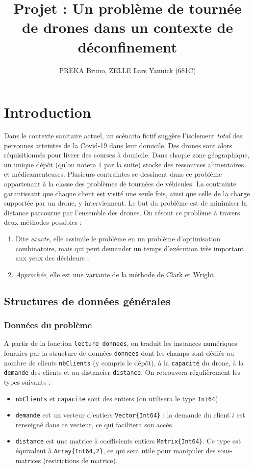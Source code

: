 \documentclass[french, 11pt, a4paper]{article} %
\title{Projet : Un problème de tournée de drones dans un contexte de déconfinement}
\author{PREKA Bruno, ZELLE Lars Yannick (681C)}
\newcommand{\smb}{\smallbreak}
\begin{document}
\maketitle



\section{Introduction}

Dans le contexte sanitaire actuel, un scénario fictif suggère l'isolement \emph{total} des personnes
atteintes de la Covid-19 dans leur domicile. Des drones sont alors réquisitionnés pour livrer des courses
à domicile.
\smb Dans chaque zone géographique, un unique dépôt (qu'on notera $1$ par la suite) stocke des ressources alimentaires et médicamenteuses.
Plusieurs contraintes se dessinent dans ce problème appartenant à la classe des problèmes de tournées de véhicules.
La contrainte garantissant que chaque client est visité une seule fois, ainsi que celle de la charge supportée par un drone,
y interviennent.
Le but du problème est de minimiser la distance parcourue par l'ensemble des drones.
\smb On résout ce problème à travers deux méthodes possibles :
\vspace{-0.2cm}
\begin{enumerate}
    \item Dite \emph{exacte}, elle assimile le problème en un problème d'optimisation
combinatoire, mais qui peut demander un temps d'exécution très important aux yeux des décideurs ;
    \item \emph{Approchée}, elle est une variante de la méthode de Clark et Wright.
\end{enumerate}

\subsection{Structures de données générales}

\subsubsection{Données du problème}
A partir de la fonction \verb+lecture_donnees+, on traduit les instances numériques fournies
par la structure de données 
\verb+donnees+ dont les champs sont dédiés au nombre de clients \verb+nbClients+ (y compris le dépôt), à
la \verb+capacité+ du drone, à la \verb+demande+ des clients et au distancier \verb+distance+. On retrouvera régulièrement les types suivants :
\begin{itemize}
    \item \verb+nbClients+ et \verb+capacite+ sont des entiers (on utilisera le type \verb+Int64+)
    \item \verb+demande+ est un vecteur d'entiers \verb+Vector{Int64}+ : la demande du client $i$ est renseigné dans ce vecteur, ce qui facilitera son accès.
    \item \verb+distance+ est une matrice à coefficients entiers \verb+Matrix{Int64}+. Ce type est équivalent à \verb+Array{Int64,2}+, ce qui sera utile pour manipuler des sous-matrices (restrictions de matrice).
\end{itemize}
\end{document}
